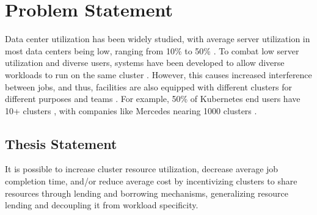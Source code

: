 \section{Problem Statement}
Data center utilization has been widely studied, with average server utilization in most data centers being low, 
ranging from 10\% to 50\%
\cite{lo_heracles_2015}. 
To combat low server utilization and diverse users, systems have been developed to allow diverse workloads to run 
on the same cluster \cite{bhattacharya_hierarchical_2013, hindman_mesos_nodate}. 
However, this causes increased interference between jobs, and thus, 
facilities are also equipped with different clusters for different purposes and teams \cite{patel_what_2022, li_lyra_2023}. 
For example, 50\% of Kubernetes \cite{verma_large-scale_2015}
end users have 10+ clusters \cite{noauthor_cncf_2023} 
, with companies like Mercedes nearing 1000 clusters \cite{noauthor_mercedes-benz_2023}.

\subsection{Thesis Statement}
It is possible to increase cluster resource utilization, decrease average job completion time, and/or reduce average cost by incentivizing clusters
to share resources through lending and borrowing mechanisms, generalizing resource lending and decoupling it from workload specificity.